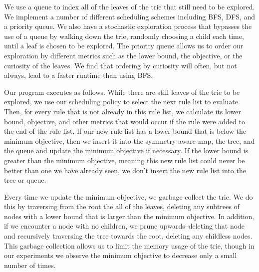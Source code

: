 \documentclass[sigconf]{acmart}
\begin{document}
We use a queue to index all of the leaves of the trie that still need to be explored. We implement a number of different scheduling schemes including BFS, DFS, and a priority queue. We also have a stochastic exploration process that bypasses the use of a queue by walking down the trie, randomly choosing a child each time, until a leaf is chosen to be explored. The priority queue allows us to order our exploration by different metrics such as the lower bound, the objective, or the curiosity of the leaves. We find that ordering by curiosity will often, but not always, lead to a faster runtime than using BFS.

Our program executes as follows. While there are still leaves of the trie to be explored, we use our scheduling policy to select the next rule list to evaluate. Then, for every rule that is not already in this rule list, we calculate its lower bound, objective, and other metrics that would occur if the rule were added to the end of the rule list. If our new rule list has a lower bound that is below the minimum objective, then we insert it into the symmetry-aware map, the tree, and the queue and update the minimum objective if necessary. If the lower bound is greater than the minimum objective, meaning this new rule list could never be better than one we have already seen, we don't insert the new rule list into the tree or queue. 

Every time we update the minimum objective, we garbage collect the trie. We do this by traversing from the root the all of the leaves, deleting any subtrees of nodes with a lower bound that is larger than the minimum objective. In addition, if we encounter a node with no children, we prune upwards--deleting that node and recursively traversing the tree towards the root, deleting any childless nodes. This garbage collection allows us to limit the memory usage of the trie, though in our experiments we observe the minimum objective to decrease only a small number of times.

%


 
\end{document}
